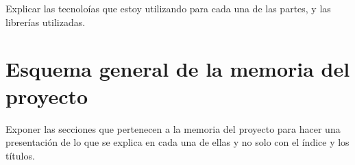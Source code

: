Explicar las tecnoloías que estoy utilizando para cada una de las partes, y las librerías utilizadas.

\section{Esquema general de la memoria del proyecto}

Exponer las secciones que pertenecen a la memoria del proyecto para hacer una presentación de lo que se explica en cada una de ellas y no solo con el índice y los títulos.








